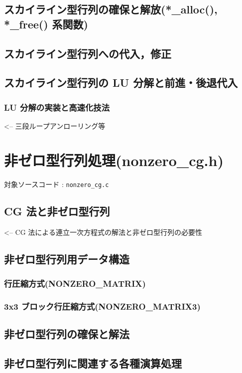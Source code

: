 \documentclass[a4paper,10pt]{jarticle}
\begin{document}
\subsection{スカイライン型行列の確保と解放(*\_alloc(), *\_free() 系関数)}

\subsection{スカイライン型行列への代入，修正}

\subsection{スカイライン型行列の LU 分解と前進・後退代入}
\subsubsection{LU 分解の実装と高速化技法}  <-- 三段ループアンローリング等


\section{非ゼロ型行列処理(nonzero\_cg.h)}
対象ソースコード : \verb|nonzero_cg.c|

\subsection{CG 法と非ゼロ型行列}
   <-- CG 法による連立一次方程式の解法と非ゼロ型行列の必要性

\subsection{非ゼロ型行列用データ構造}
\subsubsection{行圧縮方式(NONZERO\_MATRIX)}
\subsubsection{3x3 ブロック行圧縮方式(NONZERO\_MATRIX3)}

\subsection{非ゼロ型行列の確保と解法}

\subsection{非ゼロ型行列に関連する各種演算処理}
\end{document}
